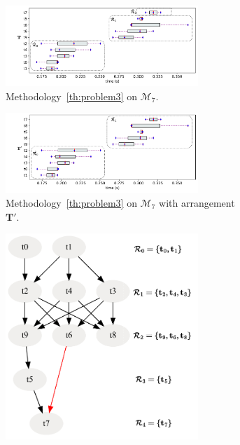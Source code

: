 \documentclass[acmsmall,screen, review]{acmart}
\begin{document}
\begin{figure}[h!]
	\centering
	\begin{subfigure}{0.85\textwidth}
		\centering
		\includegraphics[width=0.8\textwidth]{fig/ch3/minrank-eg4-r}
		\caption{Methodology~\ref{th:problem3} on $\mathcal{M}_7$. }
		\label{fig3:minrank-eg4-r}
	\end{subfigure}
	\hfill
	\begin{subfigure}{0.85\textwidth}
		\centering
		\includegraphics[width=0.8\textwidth]{fig/ch3/minrank-eg4-c}
		\caption{Methodology~\ref{th:problem3} on $\mathcal{M}_7$ with arrangement $\mathbf{T'}$.}
		\label{fig3:minrank-eg4-c}
	\end{subfigure}
	\hfill
	\begin{subfigure}{0.45\textwidth}
		\centering
		\includegraphics[width=0.8\textwidth]{fig/ch3/minrank-eg4-dfg}

\end{subfigure}
\end{figure}
\end{document}
